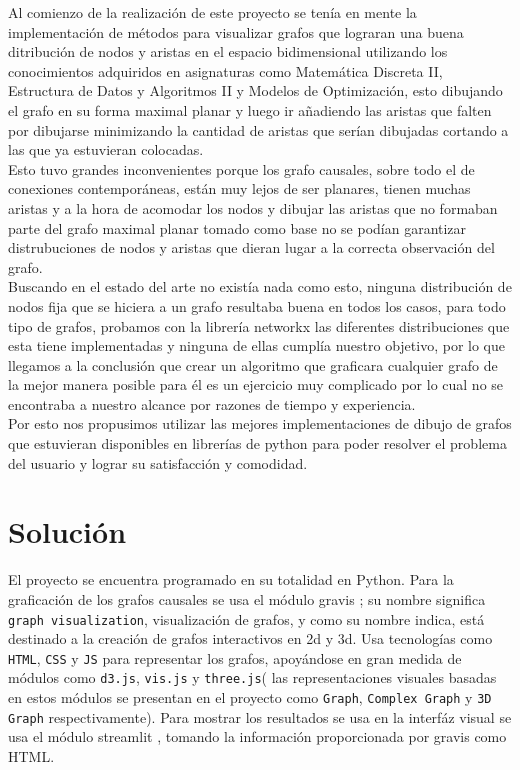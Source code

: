 \documentclass[a4paper,10pt,twocolumn]{article}
\begin{document}
Al comienzo de la realización de este proyecto se tenía en mente la implementación de métodos para visualizar grafos que lograran una buena ditribución de nodos y aristas en el espacio bidimensional utilizando los conocimientos adquiridos en asignaturas como Matemática Discreta II, Estructura de Datos y Algoritmos II y Modelos de Optimización, esto dibujando el grafo en su forma maximal planar y luego ir añadiendo las aristas que falten por dibujarse  minimizando la cantidad de aristas que serían dibujadas cortando a las que ya estuvieran colocadas. \\

Esto tuvo grandes inconvenientes porque los grafo causales, sobre todo el de conexiones contemporáneas, están muy lejos de ser planares, tienen muchas aristas y a la hora de acomodar los nodos y dibujar las aristas que no formaban parte del grafo maximal planar tomado como base no se podían garantizar distrubuciones de nodos y aristas que dieran lugar a la correcta observación del grafo.\\

Buscando en el estado del arte no existía nada como esto, ninguna distribución de nodos fija que se hiciera a un grafo resultaba buena en todos los casos, para todo tipo de grafos, probamos con la librería networkx las diferentes distribuciones que esta tiene implementadas y ninguna de ellas cumplía nuestro objetivo, por lo que llegamos a la conclusión que crear un algoritmo que graficara cualquier grafo de la mejor manera posible para él es un ejercicio muy complicado por lo cual no se encontraba a nuestro alcance por razones de tiempo y experiencia.\\

Por esto nos propusimos utilizar las mejores implementaciones de dibujo de grafos que estuvieran disponibles en librerías de python para poder resolver el problema del usuario y lograr su satisfacción y comodidad.\\



\section*{Solución}

El proyecto se encuentra programado en su totalidad en Python. Para la graficación de los grafos causales
se usa el módulo gravis \cite{gv}; su nombre significa \texttt{graph visualization}, visualización de grafos,
y como su nombre indica, está destinado a la creación de grafos interactivos en 2d y 3d.
Usa tecnologías como \texttt{HTML}, \texttt{CSS} y \texttt{JS} para representar los grafos, apoyándose en gran medida de
módulos como \texttt{d3.js}, \texttt{vis.js} y \texttt{three.js}( las representaciones visuales basadas en estos módulos
se presentan en el proyecto como \texttt{Graph}, \texttt{Complex Graph} y \texttt{3D Graph} respectivamente).
Para mostrar los resultados se usa en la interfáz visual se usa el módulo streamlit \cite{st}, tomando la información proporcionada por gravis como HTML.\\
\end{document}

